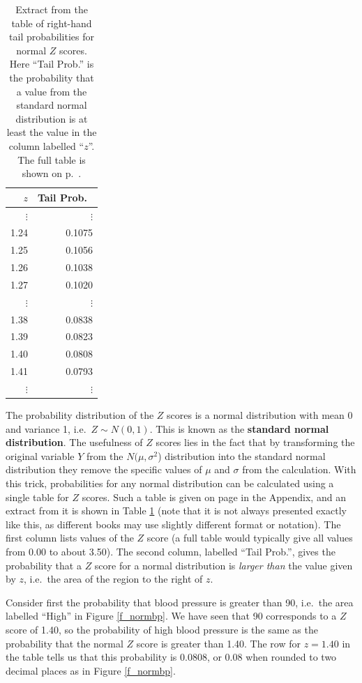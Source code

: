 \begin{table}
\caption{Extract from the table of right-hand tail probabilities for
normal $Z$ scores. Here ``Tail Prob.'' is the probability that a
value from the standard normal distribution is at least the value
in the column labelled ``$z$''. The full table is shown on p.\
\pageref{s_disttables_Z}.}
\label{t_normtab}
\begin{center}
{\footnotesize
\begin{tabular}{|r|r|}\hline
$z$ & Tail Prob.\ \\
\hline
$\vdots$ & $\vdots$\\
1.24 & 0.1075 \\
1.25 & 0.1056 \\
1.26 & 0.1038 \\
1.27 & 0.1020 \\
$\vdots$ & $\vdots$ \\
1.38 & 0.0838\\
1.39 & 0.0823\\
1.40 & 0.0808\\
1.41 & 0.0793\\
$\vdots$ & $\vdots$ \\
\hline
\end{tabular}
}
\end{center}
\end{table}

The probability distribution of the $Z$ scores is a normal distribution
with mean 0 and variance 1, i.e.\ $Z\sim N(0,1)$. This is known as the
\textbf{standard normal distribution}. The usefulness of $Z$ scores lies
in the fact that by transforming the original variable $Y$ from the
$N(\mu, \sigma^{2}$) distribution into the standard normal distribution
they remove the specific values of $\mu$ and $\sigma$ from the
calculation. With this trick, probabilities for any normal distribution
can be calculated using a single table for $Z$ scores.
Such a table is given on page
\pageref{s_disttables_Z} in the Appendix, and an extract from it is
shown in Table
\ref{t_normtab} (note that it is not
always presented exactly like this, as different books may use slightly
different format or notation). The first column lists values of the $Z$
score (a full table would typically give
all values from 0.00 to about 3.50). The second column, labelled
``Tail Prob.'', gives the probability that a $Z$ score for a normal
distribution is \emph{larger than} the value given by $z$, i.e.\ the area of
the region to the right of $z$.

Consider first the probability that blood pressure is greater than 90,
i.e.\ the area labelled ``High'' in Figure \ref{f_normbp}. We have seen
that 90 corresponds to a $Z$ score of 1.40, so the probability of
high blood pressure is the same as the probability that the normal $Z$
score is greater than 1.40. The row for $z=1.40$ in the table tells us
that this probability is 0.0808, or 0.08 when rounded to two decimal
places as in Figure \ref{f_normbp}.

